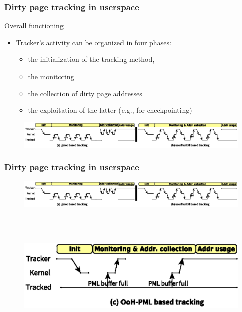 \documentclass[xcolor=table,bigger,unknownkeysallowed]{beamer}
\begin{document}
        \begin{frame}
        \frametitle{Dirty page tracking in userspace} 
			\begin{block}{Overall functioning}
				\begin{itemize}
					\item Tracker's activity can be organized in four phases: 
					\begin{itemize}
						\item the initialization of the tracking method,
						\item the monitoring
						\item the collection of dirty page addresses
						\item the exploitation of the latter (e.g., for checkpointing)
					\end{itemize}
				\end{itemize}
			\end{block}
 		    \begin{figure}
			\centering
				\includegraphics[width=1\columnwidth]{fig/solutions1}
			\end{figure}				
        \end{frame}  
        \begin{frame}
        \frametitle{Dirty page tracking in userspace} 
 		    \begin{figure}
			\centering
				\includegraphics[width=1\columnwidth]{fig/solutions1}
			\end{figure}
~\\			
~\\
 		    \begin{figure}
			\centering
				\includegraphics[width=.5\columnwidth]{fig/solutions2}				
			\end{figure}							
        \end{frame}          
\end{document}
